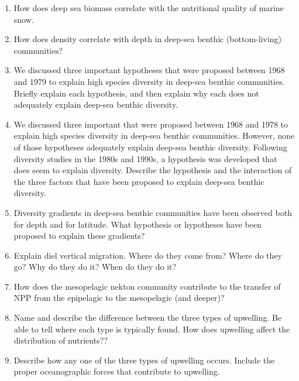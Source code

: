 \documentclass[nofonts, letterpaper]{tufte-handout}
\begin{document}
\begin{enumerate}

\item
  How does deep sea biomass correlate with the nutritional quality of
  marine snow.
  
\item
  How does density correlate with depth in deep-sea benthic
  (bottom-living) communities?

\item
  We discussed three important hypotheses that were proposed between
  1968 and 1979 to explain high species diversity in deep-sea benthic
  communities. Briefly explain each hypothesis, and then explain why
  each does not adequately explain deep-sea benthic diversity.

\item
  We discussed three important that were proposed between 1968 and 1978
  to explain high species diversity in deep-sea benthic communities.
  However, none of those hypotheses adequately explain deep-sea benthic
  diversity. Following diversity studies in the 1980s and 1990s, a
  hypothesis was developed that does seem to explain diversity. Describe
  the hypothesis and the interaction of the three factors that have been
  proposed to explain deep-sea benthic diversity.

\item
  Diversity gradients in deep-sea benthic communities have been observed
  both for depth and for latitude. What hypothesis or hypotheses have
  been proposed to explain these gradients?

\item
  Explain diel vertical migration. Where do they come from? Where do 
  they go? Why do they do it? When do they do it?
  
\item
  How does the mesopelagic nekton community contribute to the transfer
  of NPP from the epipelagic to the mesopelagic (and deeper)?
  
\item
  Name and describe the difference between the three types of upwelling. Be
  able to tell where each type is typically found. How does upwelling affect
  the distribution of nutrients??
  
\item
  Describe how any one of the three types of upwelling occurs. Include the 
  proper oceanographic forces that contribute to upwelling.
  
\end{enumerate}
\end{document}
